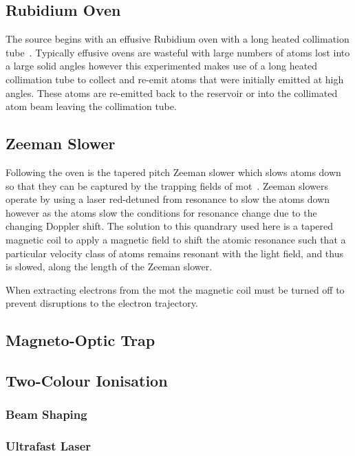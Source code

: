 \subsection{Rubidium Oven}
The source begins with an effusive Rubidium oven with a long heated collimation tube~\cite{bell_slow_2010}.
Typically effusive ovens are wasteful with large numbers of atoms lost into a large solid angles however this experimented makes use of a long heated collimation tube to collect and re-emit atoms that were initially emitted at high angles.
These atoms are re-emitted back to the reservoir or into the collimated atom beam leaving the collimation tube.

\subsection{Zeeman Slower}
Following the oven is the tapered pitch Zeeman slower which slows atoms down so that they can be captured by the trapping fields of \gls{mot}~\cite{bell_slow_2010}.
Zeeman slowers operate by using a laser red-detuned from resonance to slow the atoms down however as the atoms slow the conditions for resonance change due to the changing Doppler shift.
The solution to this quandrary used here is a tapered magnetic coil to apply a magnetic field to shift the atomic resonance such that a particular velocity class of atoms remains resonant with the light field, and thus is slowed, along the length of the Zeeman slower.

When extracting electrons from the \gls{mot} the magnetic coil must be turned off to prevent disruptions to the electron trajectory.

\subsection{Magneto-Optic Trap}


\subsection{Two-Colour Ionisation}

\subsubsection{Beam Shaping}

\subsubsection{Ultrafast Laser}


